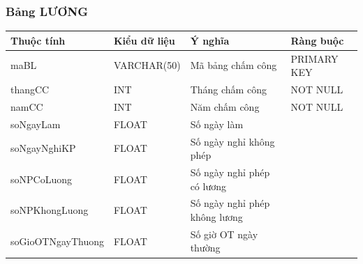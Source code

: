 \documentclass[a4paper,12pt]{report}
\begin{document}
\subsubsection{Bảng LƯƠNG}
\noindent
\begin{center}
    \begin{longtable}{|>{\centering\arraybackslash}p{4.5cm}|
        >{\centering\arraybackslash}p{3.5cm}|
        >{\centering\arraybackslash}p{3.5cm}|
        >{\centering\arraybackslash}p{4cm}|}
        \hline
        \textbf{Thuộc tính}                                                                                                               &
        \textbf{Kiểu dữ liệu}                                                                                                                             &
        \textbf{Ý nghĩa}                                                                                                 &
        \textbf{Ràng buộc}                                                                                                         \\
        \hline
        maBL &  VARCHAR(50)  & Mã bảng chấm công & PRIMARY KEY \\
        \hline
        thangCC &  INT  & Tháng chấm công & NOT NULL \\                                                                                                                          
        \hline
        namCC &  INT  & Năm chấm công & NOT NULL \\                                                                                                                          
        \hline
        soNgayLam &  FLOAT  & Số ngày làm & \\                                                                                                                          
        \hline
        soNgayNghiKP &  FLOAT  & Số ngày nghỉ không phép & \\                                                                                                                          
        \hline
        soNPCoLuong &  FLOAT  & Số ngày nghỉ phép có lương & \\                                                                                                                          
        \hline
        soNPKhongLuong &  FLOAT  & Số ngày nghỉ phép không lương & \\
        \hline
        soGioOTNgayThuong &  FLOAT  & Số giờ OT ngày thường & \\                                                                                                                          

\end{longtable}
\end{center}
\end{document}
